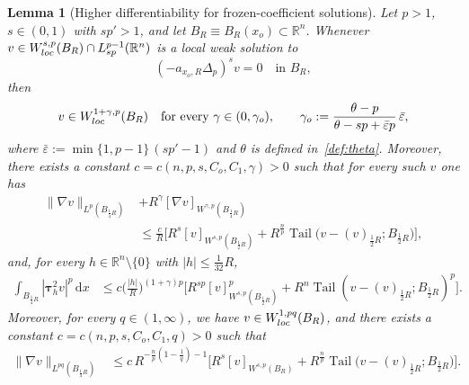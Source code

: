 \documentclass[10pt,a4paper]{amsart}
\newtheorem{lemma}{Lemma}
\newcommand{\R}{\ensuremath{\mathbb{R}}}
\DeclareMathOperator{\Tail}{Tail}
\newcommand{\dx}{\mathrm{d}x}
\renewcommand{\epsilon}{\varepsilon}
\begin{document}
\begin{lemma}[Higher differentiability for frozen-coefficient solutions]\label{lem:vi-a}
Let $p>1$, $s\in(0,1)$ with $sp'>1$, and let $B_R\equiv B_R(x_o)\subset\R^n$. Whenever $v\in W^{s,p}_{\rm loc}(B_R)\cap L^{p-1}_{sp}(\R^n)$ is a local weak solution to 
\[
(- a_{x_o,R}\Delta_p)^s v = 0 \quad \text{in } B_R,
\]
then 
\begin{equation*}
    v \in W^{1+\gamma,p}_{\rm loc}(B_R) 
    \quad \text{for every } \gamma \in (0,\gamma_o),
    \qquad 
    \gamma_o := \frac{\theta - p}{\theta - sp + \bar\epsilon p}\,\bar\epsilon,
\end{equation*}
where $\bar\epsilon := \min\{1,p-1\}\,(sp'-1)$ and $\theta$ is defined in~\eqref{def:theta}. 
Moreover, there exists a constant 
$c=c(n,p,s,C_o,C_1,\gamma)>0$ such that for every such $v$ one has
\begin{align*}
    \|\nabla v\|_{L^p(B_{\frac14R})}
    &+   R^\gamma[\nabla v]_{W^{\gamma,p}(B_{\frac14R})} \\
    &\leq
    \frac{c}{R} \Big[ R^{s}[v]_{W^{s,p}(B_{\frac12R})} +
    R^\frac{n}{p} \Tail\big(v-(v)_{\frac12R};B_{\frac12 R}\big)\Big],
\end{align*}
and, for every $h\in\R^n\setminus\{0\}$ with $|h|\le \frac1{32}R$,
\begin{align*}
    \int_{B_{\frac14 R}} |\boldsymbol{\tau}_h^2 v|^p \,\dx
    &\le 
    c \Big(\frac{|h|}{R}\Big)^{(1+\gamma)p} 
    \Big[ R^{sp} [v]_{W^{s,p}(B_{\frac12 R})}^p + R^n \Tail(v-(v)_{\frac12 R}; B_{\frac12 R})^p \Big].
\end{align*}
Moreover, for every $q\in(1,\infty)$, we have $v \in W^{1,pq}_{\rm loc}(B_R)$, and there exists a constant 
$c=c(n,p,s,C_o,C_1,q)>0$ such that
\begin{align*}
    \|\nabla v\|_{L^{pq}(B_{\frac14 R})} 
    &\le 
    c \, R^{-\frac{n}{p}\left(1-\frac{1}{q}\right)-1} 
    \Big[ R^s [v]_{W^{s,p}(B_R)} + 
    R^{\frac{n}{p}} \Tail\big(v-(v)_{\frac12 R}; B_{\frac12 R}\big) \Big].
\end{align*}
\end{lemma}
\end{document}

